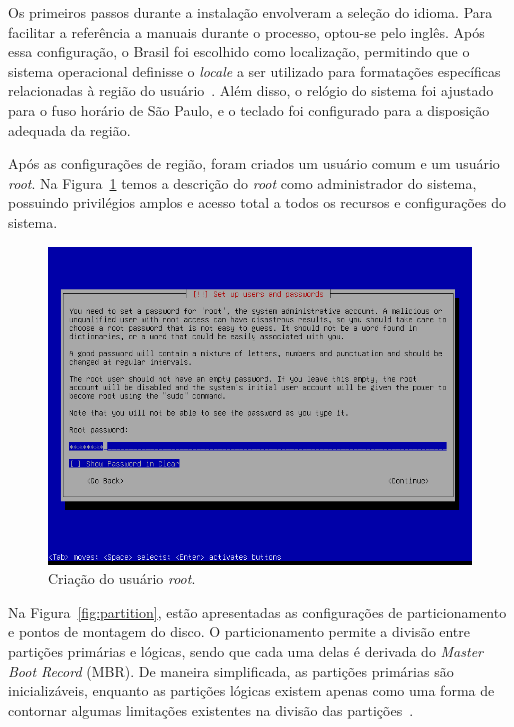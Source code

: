 \documentclass[
	12pt,				%
	oneside,   	        %
	a4paper,			%
	english,			%
	french,				%
	spanish,			%
	brazil,				%
	]{pacotes/abntex2}
\begin{document}
Os primeiros passos durante a instalação envolveram a seleção do idioma. Para facilitar a referência a manuais durante o processo, optou-se pelo inglês. Após essa configuração, o Brasil foi escolhido como localização, permitindo que o sistema operacional definisse o \textit{locale} a ser utilizado para formatações específicas relacionadas à região do usuário~\cite{kerris2010}. Além disso, o relógio do sistema foi ajustado para o fuso horário de São Paulo, e o teclado foi configurado para a disposição adequada da região.

Após as configurações de região, foram criados um usuário comum e um usuário \textit{root}. Na Figura~\ref{fig:root} temos a descrição do \textit{root} como administrador do sistema, possuindo privilégios amplos e acesso total a todos os recursos e configurações do sistema.

\begin{figure}[H]
  \centering
  \includegraphics[scale=0.7]{figuras/root.png}
  \caption{Criação do usuário \textit{root}.}
  \label{fig:root}
\end{figure}

Na Figura~\ref{fig:partition}, estão apresentadas as configurações de particionamento e pontos de montagem do disco. O particionamento permite a divisão entre partições primárias e lógicas, sendo que cada uma delas é derivada do \textit{Master Boot Record} (MBR). De maneira simplificada, as partições primárias são inicializáveis, enquanto as partições lógicas existem apenas como uma forma de contornar algumas limitações existentes na divisão das partições~\cite{archPartition}.
\end{document}
